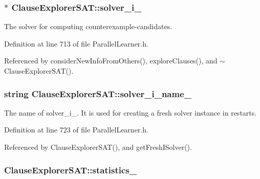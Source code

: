 \hypertarget{classClauseExplorerSAT_a65b5b3d04ff5be8bfec60d3dcf86e4d0}{
\subsubsection[{solver\-\_\-i\-\_\-}]{$\ast$ Clause\-Explorer\-S\-A\-T\-::solver\-\_\-i\-\_\-\hspace{0.3cm}{\ttfamily [protected]}}}\label{classClauseExplorerSAT_a65b5b3d04ff5be8bfec60d3dcf86e4d0}


The solver for computing counterexample-\/candidates. 



Definition at line 713 of file Parallel\-Learner.\-h.



Referenced by consider\-New\-Info\-From\-Others(), explore\-Clauses(), and $\sim$\-Clause\-Explorer\-S\-A\-T().

\hypertarget{classClauseExplorerSAT_a8d32081c8c672ce55587dae858b2ccb1}{
\subsubsection[{solver\-\_\-i\-\_\-name\-\_\-}]{\setlength{\rightskip}{0pt plus 5cm}string Clause\-Explorer\-S\-A\-T\-::solver\-\_\-i\-\_\-name\-\_\-\hspace{0.3cm}{\ttfamily [protected]}}}\label{classClauseExplorerSAT_a8d32081c8c672ce55587dae858b2ccb1}


The name of solver\-\_\-i\-\_\-. It is used for creating a fresh solver instance in restarts. 



Definition at line 723 of file Parallel\-Learner.\-h.



Referenced by Clause\-Explorer\-S\-A\-T(), and get\-Fresh\-I\-Solver().

\hypertarget{classClauseExplorerSAT_a1d37eb0233177911835bc073fbe1c224}{
\subsubsection[{statistics\-\_\-}]{ Clause\-Explorer\-S\-A\-T\-::statistics\-\_\-\hspace{0.3cm}{\ttfamily [protected]}}}\label{classClauseExplorerSAT_a1d37eb0233177911835bc073fbe1c224}



